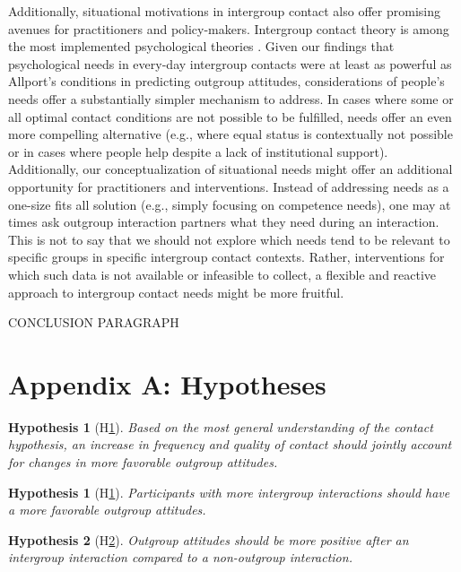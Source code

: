 \documentclass[man, 12pt, a4paper]{apa7}
\theoremstyle{break}
\theoremstyle{plain}
\newtheorem{hyp}{Hypothesis}
\newtheorem{subhyp}{Hypothesis}
\begin{document}
Additionally, situational motivations in intergroup contact also offer promising avenues for practitioners and policy-makers. Intergroup contact theory is among the most implemented psychological theories \citep[e.g.,][]{Pettigrew2006, AlRamiah2012a, Reimer2021}. Given our findings that psychological needs in every-day intergroup contacts were at least as powerful as Allport's conditions in predicting outgroup attitudes, considerations of people's needs offer a substantially simpler mechanism to address. In cases where some or all optimal contact conditions are not possible to be fulfilled, needs offer an even more compelling alternative (e.g., where equal status is contextually not possible or in cases where people help despite a lack of institutional support). Additionally, our conceptualization of situational needs might offer an additional opportunity for practitioners and interventions. Instead of addressing needs as a one-size fits all solution (e.g., simply focusing on competence needs), one may at times ask outgroup interaction partners what they need during an interaction. This is not to say that we should not explore which needs tend to be relevant to specific groups in specific intergroup contact contexts. Rather, interventions for which such data is not available or infeasible to collect, a flexible and reactive approach to intergroup contact needs might be more fruitful.

CONCLUSION PARAGRAPH

\printbibliography

\appendix

\section{Appendix A: Hypotheses}
\label{app:AppendixHypotheses}

\begin{hyp}[H\ref{hyp:contact}] \label{hyp:contact}
Based on the most general understanding of the contact hypothesis, an increase in frequency and quality of contact should jointly account for changes in more favorable outgroup attitudes.
\end{hyp}

\begin{subhyp}[H\ref{hyp:contactFreq}] \label{hyp:contactFreq}
\addtolength{\leftskip}{2.5em}
Participants with more intergroup interactions should have a more favorable outgroup attitudes.
\end{subhyp}

\begin{subhyp}[H\ref{hyp:contactDummy}] \label{hyp:contactDummy}
\addtolength{\leftskip}{2.5em}
Outgroup attitudes should be more positive after an intergroup interaction compared to a non-outgroup interaction.
\end{subhyp}
\end{document}
